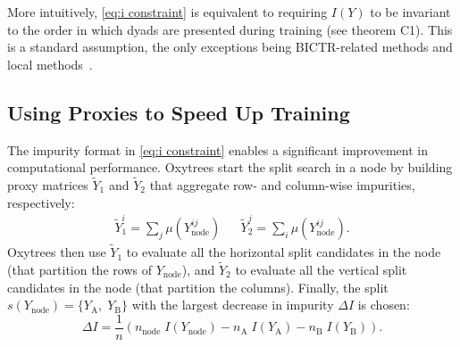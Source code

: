 \documentclass[letterpaper]{article}
\begin{document}
More intuitively, \cref{eq:i constraint} is equivalent to requiring $I(Y)$ to be invariant to the order in which dyads are presented during training (see theorem C1).
This is a standard assumption, the only exceptions being BICTR-related methods and local methods~\cite{schrynemackers_protocols_2013}.


\subsection{Using Proxies to Speed Up Training}
\label{sec:oxytrees training}

The impurity format in \cref{eq:i constraint} enables a significant improvement in computational performance.
Oxytrees start the split search in a node by building proxy matrices $\tilde Y_1$ and $\tilde Y_2$ that aggregate row- and column-wise impurities, respectively:
\begin{align}
    \label{eq:proxies general}
    \textstyle
    \tilde Y_1^i = \sum_{j} \mu(Y_\text{node}^{ij})
    &&
    \textstyle
    \tilde Y_2^j = \sum_{i} \mu(Y_\text{node}^{ij})
    \text{.}
\end{align}
Oxytrees then use $\tilde Y_1$ to evaluate all the horizontal split candidates in the node (that partition the rows of $Y_\text{node}$), and $\tilde Y_2$ to evaluate all the vertical split candidates in the node (that partition the columns).
Finally, the split $s(Y_\text{node}) = \{Y_\text{A},\; Y_\text{B}\}$ with the largest decrease in impurity $\Delta I$ is chosen:
\begin{equation}
    \label{eq:delta i}
    \textstyle
    \Delta I =
        \frac{1}{n}(
            n_\text{node}\;I(Y_\text{node})
            - n_\text{A}\;I(Y_\text{A})
            - n_\text{B}\;I(Y_\text{B})
        )
        \text{.}
\end{equation}
\end{document}
